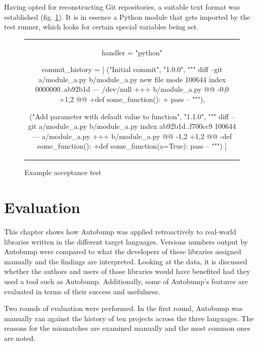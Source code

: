 \documentclass{l4proj}
\begin{document}
Having opted for reconstructing Git repositories, a suitable text
format was established (fig. \ref{ExampleAcceptanceTest}). It is in
essence a Python module that gets imported by the test runner, which
looks for certain special variables being set.

\begin{figure}[H]
\caption{Example acceptance test}
\label{ExampleAcceptanceTest}
\vspace{-\baselineskip}
\begin{center}
\begin{tabular}{c}
\begin{python}
handler = "python"

commit_history = [
    ("Initial commit", "1.0.0",
     """
     diff --git a/module_a.py b/module_a.py
     new file mode 100644
     index 0000000..ab92b1d
     --- /dev/null
     +++ b/module_a.py
     @@ -0,0 +1,2 @@
     +def some_function():
     +    pass
     --
     """),

    ("Add parameter with default value to function", "1.1.0",
     """
     diff --git a/module_a.py b/module_a.py
     index ab92b1d..f700cc9 100644
     --- a/module_a.py
     +++ b/module_a.py
     @@ -1,2 +1,2 @@
     -def some_function():
     +def some_function(a=True):
     pass
     --
     """)
]
\end{python}
\end{tabular}
\end{center}
\end{figure}

\chapter{Evaluation}
\label{Evaluation}

This chapter shows how Autobump was applied retroactively to
real-world libraries written in the different target languages.
Versions numbers output by Autobump were compared to what the
developers of these libraries assigned manually and the findings are
interpreted. Looking at the data, it is discussed whether the authors
and users of those libraries would have benefited had they used a tool
such as Autobump. Additionally, some of Autobump's features are
evaluated in terms of their success and usefulness.

Two rounds of evaluation were performed. In the first round, Autobump
was manually ran against the history of ten projects across the
three languages. The reasons for the mismatches are examined manually
and the most common ones are noted.
\end{document}
